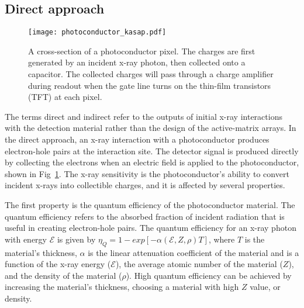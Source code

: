 \subsection{Direct approach}

\begin{figure}[ht]
\begin{minipage}{\linewidth}
\centering
\texttt{[image: photoconductor\_kasap.pdf]}
\end{minipage}
\caption[A cross-section of a photoconductor pixel. The charges are first generated by an incident x-ray photon, then collected onto a capacitor.  The collected charges will pass through a charge amplifier during readout when the gate line turns on the thin-film transistors (TFT) at each pixel.]{A cross-section of a photoconductor pixel\footnotemark.  The charges are first generated by an incident x-ray photon, then collected onto a capacitor.  The collected charges will pass through a charge amplifier during readout when the gate line turns on the thin-film transistors (TFT) at each pixel.}
\label{fig:photoconductor_cross_section}
\end{figure}

The terms direct and indirect refer to the outputs of initial x-ray interactions with the detection material rather than the design of the active-matrix arrays.  In the direct approach, an x-ray interaction with a photoconductor produces electron-hole pairs at the interaction site.  The detector signal is produced directly by collecting the electrons when an electric field is applied to the photoconductor, shown in Fig~\ref{fig:photoconductor_cross_section}.  The x-ray sensitivity is the photoconductor's ability to convert incident x-rays into collectible charges, and it is affected by several properties.

The first property is the quantum efficiency of the photoconductor material.  The quantum efficiency refers to the absorbed fraction of incident radiation that is useful in creating electron-hole pairs.  The quantum efficiency for an x-ray photon with energy $\mathcal{E}$ is given by $\eta_Q = 1 - exp[-\alpha (\mathcal{E}, Z, \rho) T]$, where $T$ is the material's thickness, $\alpha$ is the linear attenuation coefficient of the material and is a function of the x-ray energy ($\mathcal{E}$), the average atomic number of the material ($Z$), and the density of the material ($\rho$).  High quantum efficiency can be achieved by increasing the material's thickness, choosing a material with high $Z$ value, or density.  

